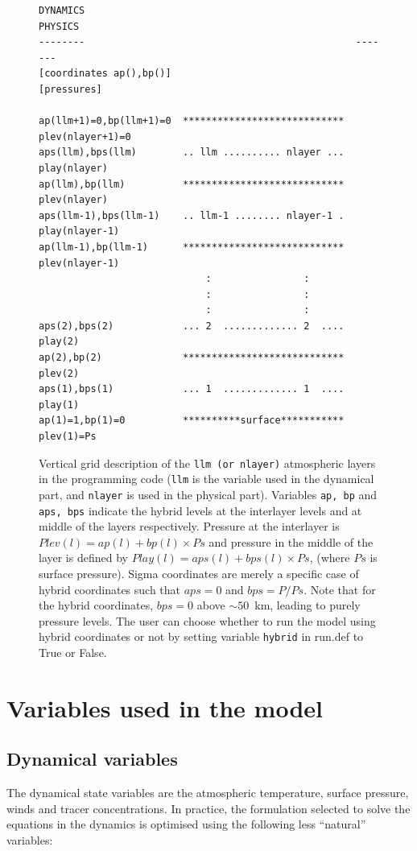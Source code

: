 \begin{figure}
\begin{verbatim}
DYNAMICS                                               PHYSICS
--------                                               -------
[coordinates ap(),bp()]                                [pressures]

ap(llm+1)=0,bp(llm+1)=0  ****************************  plev(nlayer+1)=0
aps(llm),bps(llm)        .. llm .......... nlayer ...  play(nlayer)
ap(llm),bp(llm)          ****************************  plev(nlayer)
aps(llm-1),bps(llm-1)    .. llm-1 ........ nlayer-1 .  play(nlayer-1)
ap(llm-1),bp(llm-1)      ****************************  plev(nlayer-1)
                             :                :
                             :                :
                             :                :
aps(2),bps(2)            ... 2  ............. 2  ....  play(2)
ap(2),bp(2)              ****************************  plev(2)
aps(1),bps(1)            ... 1  ............. 1  ....  play(1)
ap(1)=1,bp(1)=0          **********surface***********  plev(1)=Ps
\end{verbatim}
\caption{Vertical grid description of the {\tt llm (or nlayer)}
atmospheric layers
in the programming code ({\tt llm} is the variable used in the dynamical part,
and {\tt nlayer} is used in the physical part).
Variables {\tt ap, bp} and {\tt aps, bps} indicate the hybrid levels at
the interlayer levels and at middle of the layers respectively.
Pressure at the interlayer is  $Plev(l)=ap(l)+bp(l) \times Ps$ and pressure
in the middle of the layer is defined by $Play(l)=aps(l)+bps(l) \times Ps$,
(where $Ps$ is surface pressure).
Sigma coordinates are merely a specific case of hybrid
coordinates such that $aps=0$ and $bps=P/Ps$. 
Note that for the hybrid coordinates, $bps=0$ above $\sim50$~km, leading to
purely pressure levels.
The user can choose whether to run the model using hybrid coordinates or not
by setting variable {\tt hybrid} in run.def to True or False.}
\label{fg:sigma}
\end{figure}

\section{Variables used in the model}

\subsection{Dynamical variables}
The dynamical state variables are the atmospheric temperature,
surface pressure, winds and tracer concentrations.
In practice, the formulation selected to solve the equations in
the dynamics %
is optimised using the following less ``natural'' variables:

